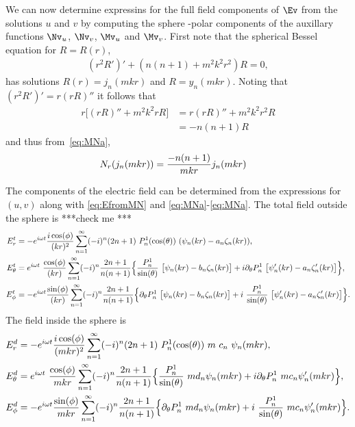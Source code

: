 We can now determine expressins for the full field components of $\Ev$ from the solutions $u$ and $v$ by computing
the sphere -polar components of the auxillary functions $\Nv_u$, $\Nv_v$, $\Mv_u$ and $\Mv_v$. 
First note that the spherical Bessel equation for $R=R(r)$, 
\begin{align*}
   (r^2R')' + ( n(n+1) + m^2 k^2 r^2) R=0,
\end{align*}
has solutions $R(r) =j_n(m kr)$ and $R=y_n(m kr)$. 
Noting that $(r^2R')' = r (rR)''$ it follows that
\begin{align*}
    r \Big[ (rR)'' + m^2 k^2 r R\Big] &=  r (rR)'' + m^2 k^2 r^2 R \\
       &= -n(n+1) R
\end{align*}
and thus from~\eqref{eq:MNa},
\begin{align*}
  N_r( j_n(mkr) ) &= {-n(n+1)\over mk r} j_n(mkr)
\end{align*}

The components of the electric field can be determined from the expressions for $(u,v)$ along with
\eqref{eq:EfromMN} and \eqref{eq:MNa}-\eqref{eq:MNa}. The total field outside the sphere is ***check me ***
\begin{align}
   E_r^t &= - e^{i\omega t} {i\cos(\phi)\over (kr)^2} 
       \sum_{n=1}^\infty (-i)^n (2n+1)~P_n^1(\cos(\theta))~( \psi_n(kr)- a_n \zeta_n(kr) ),  \label{eq:ScatSpherea}\\
   E_\theta^t &= e^{i\omega t}~{\cos(\phi)\over (kr)}
              \sum_{n=1}^\infty (-i)^n {2n+1 \over n(n+1)} 
                \Big\{ {P_n^1 \over \sin(\theta) }~\big[ \psi_n(kr)- b_n \zeta_n(kr) \big]
                             + i \partial_\theta P_n^1 ~\big[ \psi_n'(kr)- a_n \zeta_n'(kr) \big]
                \Big\}  
                                   ,  \label{eq:ScatSphereb} \\
   E_\phi^t &= -e^{i\omega t}{\sin(\phi)\over (kr)}
               \sum_{n=1}^\infty (-i)^n {2n+1 \over n(n+1)}
                 \Big\{ \partial_\theta P_n^1~\big[ \psi_n(kr)- b_n \zeta_n(kr) \big]
                             +i~ {P_n^1 \over \sin(\theta)}~\big[ \psi_n'(kr)- a_n \zeta_n'(kr) \big]
                 \Big\} .  \label{eq:ScatSpherec}
\end{align}
The field inside the sphere is 
\begin{align}
   E_r^d &= - e^{i\omega t} {i\cos(\phi)\over (m kr)^2} 
       \sum_{n=1}^\infty (-i)^n (2n+1)~P_n^1(\cos(\theta))~m~ c_n~ \psi_n(mkr),  \label{eq:ScatSphereInsidea}\\
   E_\theta^d &= e^{i\omega t}~{\cos(\phi)\over m k r}
              \sum_{n=1}^\infty (-i)^n {2n+1 \over n(n+1)} 
                \Big\{ {P_n^1 \over \sin(\theta) }~ m d_n \psi_n(mkr)
                             + i \partial_\theta P_n^1 ~ m c_n \psi_n'(mkr)
                \Big\}  
                                   ,  \label{eq:ScatSphereInsideb} \\
   E_\phi^d &= -e^{i\omega t}{\sin(\phi)\over mkr}
               \sum_{n=1}^\infty (-i)^n {2n+1 \over n(n+1)}
                 \Big\{ \partial_\theta P_n^1~ m d_n \psi_n(mkr) 
                             +i~ {P_n^1 \over \sin(\theta)}~ m c_n \psi_n'(mkr) 
                 \Big\} .  \label{eq:ScatSphereInsidec}
\end{align}

